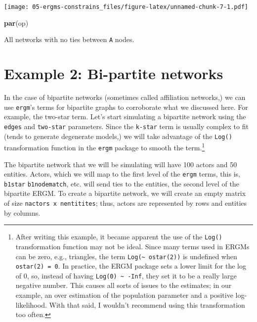 \documentclass[]{book}
\newenvironment{Shaded}{\begin{snugshade}}{\end{snugshade}}
\newcommand{\KeywordTok}[1]{\textcolor[rgb]{0.13,0.29,0.53}{\textbf{#1}}}
\newcommand{\NormalTok}[1]{#1}
\begin{document}
\texttt{[image: 05-ergms-constrains\_files/figure-latex/unnamed-chunk-7-1.pdf]}

\begin{Shaded}
\begin{Highlighting}[]
\KeywordTok{par}\NormalTok{(op)}
\end{Highlighting}
\end{Shaded}

All networks with no ties between \texttt{A} nodes.

\hypertarget{example-2-bi-partite-networks}{%
\section{Example 2: Bi-partite networks}\label{example-2-bi-partite-networks}}

In the case of bipartite networks (sometimes called affiliation networks,) we can
use \texttt{ergm}'s terms for bipartite graphs to corroborate what we discussed
here. For example, the two-star term. Let's start simulating a bipartite
network using the \texttt{edges} and \texttt{two-star} parameters. Since the \texttt{k-star} term
is usually complex to fit (tends to generate degenerate models,) we will
take advantage of the \texttt{Log()} transformation function in the \texttt{ergm} package
to smooth the term.\footnote{After writing this example, it became apparent the use of
  the \texttt{Log()} transformation function may not be ideal. Since many terms used
  in ERGMs can be zero, e.g., triangles, the term \texttt{Log(\textasciitilde{}\ ostar(2))} is undefined
  when \texttt{ostar(2)\ =\ 0}. In practice, the ERGM package sets a lower limit for the
  log of 0, so, instead of having \texttt{Log(0)\ \textasciitilde{}\ -Inf}, they set it to be a really
  large negative number. This causes all sorts of issues to the estimates; in
  our example, an over estimation of the population parameter and a positive
  log-likelihood. With that said, I wouldn't recommend using
  this transformation too often.}

The bipartite network that we will be simulating will have 100 actors and
50 entities. Actors, which we will map to the first level of the \texttt{ergm} terms,
this is, \texttt{b1star} \texttt{b1nodematch}, etc. will send ties to the entities,
the second level of the bipartite ERGM. To create a bipartite network, we will
create an empty matrix of size \texttt{nactors\ x\ nentitites}; thus, actors are
represented by rows and entities by columns.
\end{document}

